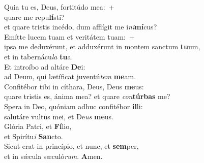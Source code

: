 \evenverse Quia tu es, Deus, fortitúdo mea:~+\\\evenverse  quare me repu\textbf{lí}sti?~\*\\
\evenverse et quare tristis incédo, dum afflígit me i\textit{ni}\textbf{mí}cus?\\
\oddverse Emítte lucem tuam et veritátem tuam:~+\\
\oddverse  ipsa me deduxérunt, et adduxérunt in montem sanctum \textbf{tu}um,~\*\\
\oddverse et in tabernácu\textit{la} \textbf{tu}a.\\
\evenverse Et introíbo ad altáre \textbf{De}i:~\*\\
\evenverse ad Deum, qui lætíficat juventú\textit{tem} \textbf{me}am.\\
\oddverse Confitébor tibi in cíthara, Deus, Deus \textbf{me}us:~\*\\
\oddverse quare tristis es, ánima mea? et quare \textit{con}\textbf{túr}\textbf{bas} me?\\
\evenverse Spera in Deo, quóniam adhuc confitébor \textbf{il}li:~\*\\
\evenverse salutáre vultus mei, et De\textit{us} \textbf{me}us.\\
\oddverse Glória Patri, et \textbf{Fí}lio,~\*\\
\oddverse et Spirítu\textit{i} \textbf{San}cto.\\
\evenverse Sicut erat in princípio, et nunc, et \textbf{sem}per,~\*\\
\evenverse et in sǽcula sæculó\textit{rum}. \textbf{A}men.\\
